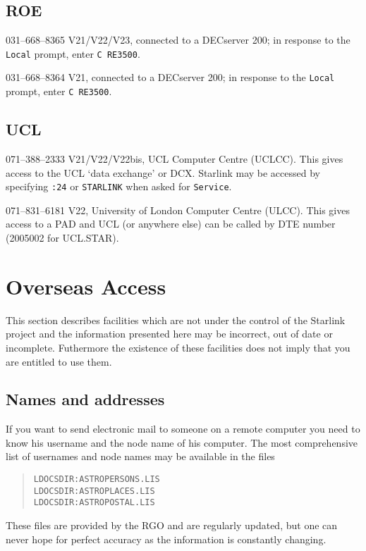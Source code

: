 \subsection{ROE}
\begin{list}{}{\setlength{\labelwidth}{\numlen}\setlength{\leftmargin}{\numlen}
\addtolength{\leftmargin}{\labelsep}}
\item[031--668--8365] V21/V22/V23, connected to a DECserver 200;
in response to the {\tt Local} prompt, enter {\tt C RE3500}.
\item[031--668--8364] V21, connected to a DECserver 200;
in response to the {\tt Local} prompt, enter {\tt C RE3500}.
\end{list}

\subsection{UCL}
\begin{list}{}{\setlength{\labelwidth}{\numlen}\setlength{\leftmargin}{\numlen}
\addtolength{\leftmargin}{\labelsep}}
\item[071--388--2333] V21/V22/V22bis, UCL Computer Centre (UCLCC).
This gives access to the UCL `data exchange' or DCX.
Starlink may be accessed by specifying {\tt :24} or {\tt STARLINK} when asked
for {\tt Service}.
\item[071--831--6181] V22, University of London Computer Centre (ULCC).
This gives access to a PAD and UCL (or anywhere else) can be called
by DTE number (2005002 for UCL.STAR).
\end{list}

\section{Overseas Access}

This section describes facilities which are not under the control of the
Starlink project and the information presented here may be incorrect, out of
date or incomplete.
Futhermore the existence of these facilities does not imply that you are
entitled to use them.

\subsection{Names and addresses}

If you want to send electronic mail to someone on a remote computer you need
to know his username and the node name of his computer. The most
comprehensive list of usernames and node names may be available in the files
\begin{quote}
{\tt LDOCSDIR:ASTROPERSONS.LIS\\
LDOCSDIR:ASTROPLACES.LIS\\
LDOCSDIR:ASTROPOSTAL.LIS}
\end{quote}
These files are provided by the RGO and are regularly updated, but one can
never hope for perfect accuracy as the information is constantly changing.

